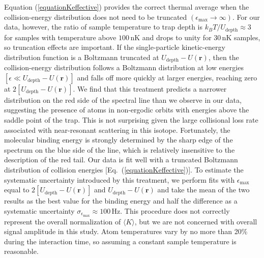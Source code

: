 Equation (\ref{equationKeffective}) provides the correct thermal average when the collision-energy distribution does not need to be truncated $(\epsilon_{\text{max}}\rightarrow \infty)$. For our data, however, the ratio of sample temperature to trap depth is $k_BT/U_{\text{depth}}\approx 3$ for samples with temperature above $100$\,nK and drops to unity for 30\,nK samples, so truncation effects are important. If the single-particle kinetic-energy distribution function is a Boltzmann truncated at $U_{\text{depth}}-U(\mathbf{r})$, then the collision-energy distribution follows a Boltzmann distribution at low energies $[\epsilon\ll U_{\text{depth}}-U(\mathbf{r})]$ and falls off more quickly at larger energies, reaching zero at $2[U_{\text{depth}}-U(\mathbf{r})]$. We find that this treatment predicts a narrower distribution on the red side of the spectral line than we observe in our data, suggesting the presence of atoms in non-ergodic orbits with energies above the saddle point of the trap. This is not surprising given the large collisional loss rate associated with near-resonant scattering in this isotope. Fortunately, the molecular binding energy is strongly determined by the sharp edge of the spectrum on the blue side of the line, which is relatively insensitive to the description of the red tail. Our data is fit well with a truncated Boltzmann distribution of collision energies [Eq.~(\ref{equationKeffective})]. To estimate the systematic uncertainty introduced by this treatment, we perform fits with $\epsilon_{\text{max}}$ equal to $2[U_{\text{depth}}-U(\mathbf{r})]$ and $U_{\text{depth}}-U(\mathbf{r})$ and take the mean of the two results as the best value for the binding energy and half the difference as a systematic uncertainty $\sigma_{\epsilon_{\text{max}}}\approx 100$\,Hz. This procedure does not correctly represent the overall normalization of $\langle K \rangle$, but we are not concerned with overall signal amplitude in this study. Atom temperatures vary by no more than 20\% during the interaction time, so assuming a constant sample temperature is reasonable.




